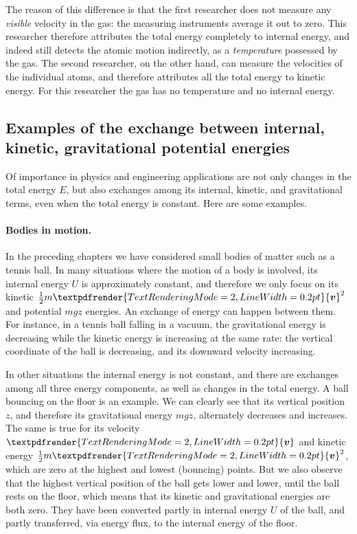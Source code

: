 \documentclass[a4paper,12pt,%
onecolumn,oneside,%
british%
]{memoir}
\renewcommand*{\bm}[1]{\textpdfrender{TextRenderingMode=2,LineWidth=0.2pt}{\boldsymbol{#1}}}
\renewcommand*{\|}[1][]{\nonscript\:#1\vert\nonscript\:\mathopen{}}
\newcommand*{\yv}{\bm{v}}
\newcommand*{\ym}{m}%
\newcommand*{\yE}{E}
\newcommand*{\yU}{U}
\begin{document}
The reason of this difference is that the first researcher does not measure any \emph{visible} velocity in the gas: the measuring instruments average it out to zero. This researcher therefore attributes the total energy completely to internal energy, and indeed still detects the atomic motion indirectly, as a \emph{temperature} possessed by the gas. The second researcher, on the other hand, can measure the velocities of the individual atoms, and therefore attributes all the total energy to kinetic energy. For this researcher the gas has no temperature and no internal energy.


\subsection{Examples of the exchange between internal, kinetic, gravitational potential energies}
\label{sec:energy_constitutive_content}

Of importance in physics and engineering applications are not only changes in the total energy $\yE$, but also exchanges among its internal, kinetic, and gravitational terms, even when the total energy is constant. Here are some examples.

\paragraph{Bodies in motion.}

In the preceding chapters we have considered small bodies of matter such as a tennis ball. In many situations where the motion of a body is involved, its internal energy $\yU$ is approximately constant, and therefore we only focus on its kinetic $\tfrac{1}{2}\ym \yv^{2}$ and potential $\ym g z$ energies. An exchange of energy can happen between them. For instance, in a tennis ball falling in a vacuum, the gravitational energy is decreasing while the kinetic energy is increasing at the same rate: the vertical coordinate of the ball is decreasing, and its downward velocity increasing.

In other situations the internal energy is not constant, and there are exchanges among all three energy components, as well as changes in the total energy. A ball bouncing on the floor is an example. We can clearly see that its vertical position $z$, and therefore its gravitational energy $\ym g z$, alternately decreases and increases. The same is true for its velocity $\yv$ and kinetic energy $\tfrac{1}{2}\ym \yv^{2}$, which are zero at the highest and lowest (bouncing) points. But we also observe that the highest vertical position of the ball gets lower and lower, until the ball rests on the floor, which means that its kinetic and gravitational energies are both zero. They have been converted partly in internal energy $\yU$ of the ball, and partly transferred, via energy flux, to the internal energy of the floor.
\end{document}
